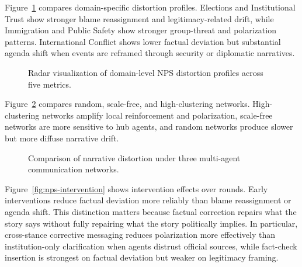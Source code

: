 Figure~\ref{fig:nps-domain-radar} compares domain-specific distortion profiles. Elections and Institutional Trust show stronger blame reassignment and legitimacy-related drift, while Immigration and Public Safety show stronger group-threat and polarization patterns. International Conflict shows lower factual deviation but substantial agenda shift when events are reframed through security or diplomatic narratives.

\begin{figure}[t]
\centering
{}
\caption{Radar visualization of domain-level NPS distortion profiles across five metrics.}
\label{fig:nps-domain-radar}
\end{figure}

Figure~\ref{fig:nps-network-panels} compares random, scale-free, and high-clustering networks. High-clustering networks amplify local reinforcement and polarization, scale-free networks are more sensitive to hub agents, and random networks produce slower but more diffuse narrative drift.

\begin{figure}[t]
\centering
{}
\caption{Comparison of narrative distortion under three multi-agent communication networks.}
\label{fig:nps-network-panels}
\end{figure}

Figure~\ref{fig:nps-intervention} shows intervention effects over rounds. Early interventions reduce factual deviation more reliably than blame reassignment or agenda shift. This distinction matters because factual correction repairs what the story says without fully repairing what the story politically implies. In particular, cross-stance corrective messaging reduces polarization more effectively than institution-only clarification when agents distrust official sources, while fact-check insertion is strongest on factual deviation but weaker on legitimacy framing.

